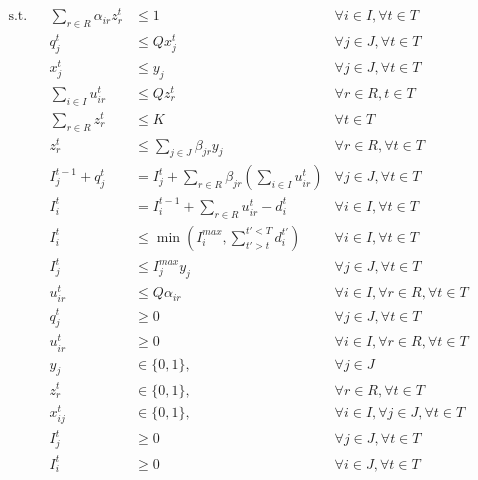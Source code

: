 \documentclass[12pt, a4paper]{article}
\begin{document}
\begin{align}
\text{s.t.}  &&\sum_{r\in R} \alpha_{ir} z^t_r 	&\leq 1 					&\forall i\in I, \forall t\in T  \label{const:customersingleroute}\\
		&&q^t_j 								&\leq Q x^t_j				&\forall j\in J, \forall t\in T \label{const:plantcapacity}\\
		&&x^t_j 								&\leq y_j   				&\forall j\in J, \forall t\in T\label{const:nounselectedroutes}\\
		&&\sum_{i\in I} u^t_{ir}   				&\leq  Q z^t_r 				&\forall r\in R, t\in T\label{const:capacityonroute}\\
		&&\sum_{r\in R} z^t_r 					&\leq K 					&\forall t\in T\label{const:fleetsizelimitation}\\
		&&z^t_r 								&\leq \sum_{j\in J}\beta_{jr} y_j 				&\forall r\in R, \forall t\in T\label{const:routestartsfromDC}\\
		&&I^{t-1}_j + q^t_j   					&=I^t_j +\sum_{r\in R}\beta_{jr} \left(\sum_{i\in I}u^t_{ir}\right) 	&\forall j\in J, \forall t\in T \label{const:flowconversationatDC}\\
		&&I^t_i				&=I^{t-1}_i+ \sum_{r\in R} u^t_{ir}-d^t_i 	&\forall i\in I, \forall t\in T\label{const:flowconservationatcustomer}\\
		&&I^t_i 			&\leq \min(I^{max}_i, \sum_{t'>t}^{t'<T}d^{t'}_i) 		&\forall i\in I, \forall t\in T\label{const:maxinventorycust}\\
		&&I^t_j									&\leq I^{max}_j y_j  				&\forall j\in J,\forall t\in T\label{const:capconstraintatdepot}\\	
		&&u_{ir}^t 			&\leq Q \alpha_{ir}						& \forall i\in I, \forall r\in R,\forall t\in T	\label{const:upperbound-u}\\
		&&q^t_j 						&\geq 0 					& \forall j\in J,\forall t\in T	\\
		&&u^t_{ir}						&\geq 0 					&\forall i\in I, \forall r\in R,\forall t\in T	\\
        &&y_{j}									& \in \{0,1\}, 				&\forall j\in J\label{12}\\	
		&&z^t_r									&\in \{0,1\}, 				&\forall r\in R, \forall t\in T						\label{13}\\
		&&x^t_{ij}								&\in \{0,1\},				&\forall i \in I, \forall j\in J,\forall t\in T		\label{14} \\
		&&I_j^t 								& \geq 0					&\forall j \in J, \forall t\in T \\
		&&I_i^t 								& \geq 0					&\forall i \in J, \forall t\in T \\
\end{align}
\end{document}
